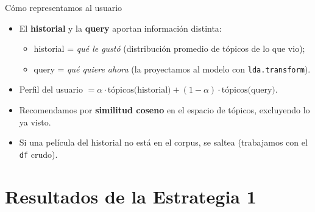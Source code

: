\documentclass[10pt,aspectratio=169]{beamer}
\begin{document}
\begin{frame}{Cómo representamos al usuario}
  \begin{itemize}
    \item El \textbf{historial} y la \textbf{query} aportan información distinta:
      \begin{itemize}
        \item historial = \emph{qué le gustó} (distribución promedio de tópicos de lo que vio);
        \item query = \emph{qué quiere ahora} (la proyectamos al modelo con \texttt{lda.transform}).
      \end{itemize}
    \item Perfil del usuario $= \alpha \cdot \text{tópicos(historial)} + (1-\alpha)\cdot \text{tópicos(query)}$.
    \item Recomendamos por \textbf{similitud coseno} en el espacio de tópicos, excluyendo lo ya visto.
    \item Si una película del historial no está en el corpus, se saltea (trabajamos con el \texttt{df} crudo).
  \end{itemize}
\end{frame}

\section{Resultados de la Estrategia 1}
\end{document}
